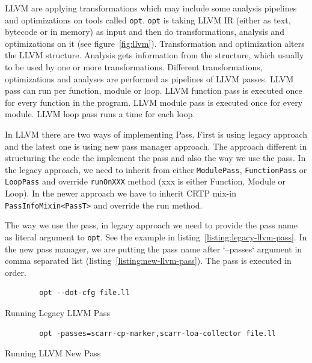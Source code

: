 LLVM are applying transformations \textemdash{} which may include some analysis
pipelines \textemdash{} and optimizations on tools called \texttt{opt}.
\texttt{opt} is taking LLVM IR (either as text, bytecode or in memory) as input
and then do transformations, analysis and optimizations on it (see
figure~\ref{fig:llvm}). Transformation and optimization alters the LLVM
structure. Analysis gets information from the structure, which usually to be
used by one or more transformations. Different transformations, optimizations
and analyses are performed as pipelines of LLVM passes. LLVM pass can run per
function, module or loop. LLVM function pass is executed once for every function
in the program. LLVM module pass is executed once for every module. LLVM loop
pass runs a time for each loop.  


In LLVM there are two ways of implementing Pass. First is using legacy approach
and the latest one is using new pass manager approach. The approach different in
structuring the code the implement the pass and also the way we use the pass.
In the legacy approach, we need to inherit from either \texttt{ModulePass},
\texttt{FunctionPass} or \texttt{LoopPass} and override \texttt{runOnXXX} method
(xxx is either Function, Module or Loop). In the newer approach we have to
inherit CRTP mix-in \texttt{PassInfoMixin<PassT>} and override the run method.

The way we use the pass, in legacy approach we need to provide the pass name as
literal argument to \texttt{opt}. See the example in
listing~\ref{listing:legacy-llvm-pass}. In the new pass manager, we are putting
the pass name after `--passes` argument in comma separated list
(listing~\ref{listing:new-llvm-pass}). The pass is executed in order.

\begin{listing}[htbp]
    \begin{verbatim}
        opt --dot-cfg file.ll 
    \end{verbatim}
    \caption{Running Legacy LLVM Pass}    
    \label{listing:legacy-llvm-pass}
\end{listing}

\begin{listing}[htpb]
    \begin{verbatim}
        opt -passes=scarr-cp-marker,scarr-loa-collector file.ll 
    \end{verbatim}
\caption{Running LLVM New Pass}    
\label{listing:new-llvm-pass}
\end{listing}

